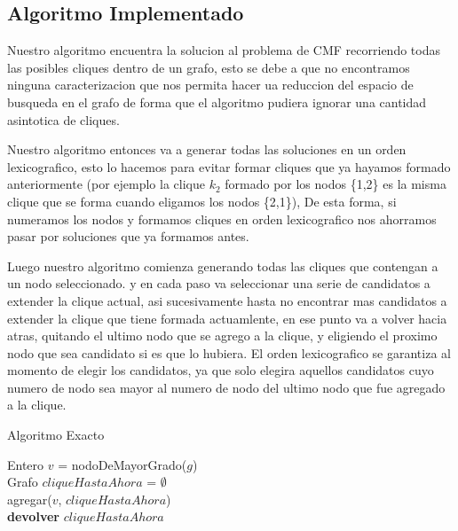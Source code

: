 \subsection{Algoritmo Implementado}

Nuestro algoritmo encuentra la solucion al problema de CMF recorriendo todas las posibles cliques dentro de un grafo, esto se debe a que no encontramos ninguna caracterizacion que nos permita hacer ua reduccion del espacio de busqueda en el grafo de forma que el algoritmo pudiera ignorar una cantidad asintotica de cliques.

Nuestro algoritmo entonces va a generar todas las soluciones en un orden lexicografico, esto lo hacemos para evitar formar cliques que ya hayamos formado anteriormente (por ejemplo la clique $k_{2}$ formado por los nodos \{1,2\} es la misma clique que se forma cuando eligamos los nodos \{2,1\}), De esta forma, si numeramos los nodos y formamos cliques en orden lexicografico nos ahorramos pasar por soluciones que ya formamos antes.

Luego nuestro algoritmo comienza generando todas las cliques que contengan a un nodo seleccionado. y en cada paso va seleccionar una serie de candidatos a extender la clique actual, asi sucesivamente hasta no encontrar mas candidatos a extender la clique que tiene formada actuamlente, en ese punto va a volver hacia atras, quitando el ultimo nodo que se agrego a la clique, y eligiendo el proximo nodo que sea candidato si es que lo hubiera. El orden lexicografico se garantiza al momento de elegir los candidatos, ya que solo elegira aquellos candidatos cuyo numero de nodo sea mayor al numero de nodo del ultimo nodo que fue agregado a la clique.

\begin{algorithm}[H]
    \SetAlgoLined
    \caption{Algoritmo Exacto}

    





	Entero $v$ = nodoDeMayorGrado($g$)\\
	Grafo $cliqueHastaAhora$ = $\emptyset$\\
	agregar($v$, $cliqueHastaAhora$)\\
\textbf{devolver} $cliqueHastaAhora$
\end{algorithm}